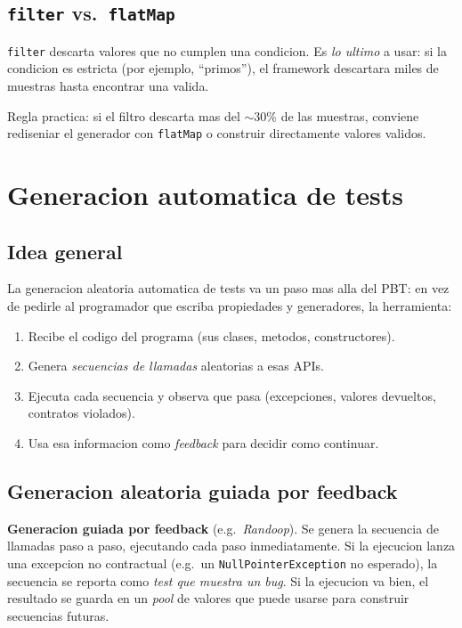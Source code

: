 \documentclass[12pt,a4paper]{article}
\begin{document}
\subsection{\texttt{filter} vs.\ \texttt{flatMap}}

\texttt{filter} descarta valores que no cumplen una condicion. Es \emph{lo ultimo} a usar:
si la condicion es estricta (por ejemplo, ``primos''), el framework descartara miles de
muestras hasta encontrar una valida.

\begin{ideabox}
Regla practica: si el filtro descarta mas del $\sim$30\% de las muestras, conviene rediseniar
el generador con \texttt{flatMap} o construir directamente valores validos.
\end{ideabox}

\section{Generacion automatica de tests}

\subsection{Idea general}

La generacion aleatoria automatica de tests va un paso mas alla del PBT: en vez de pedirle al
programador que escriba propiedades y generadores, la herramienta:

\begin{enumerate}
  \item Recibe el codigo del programa (sus clases, metodos, constructores).
  \item Genera \emph{secuencias de llamadas} aleatorias a esas APIs.
  \item Ejecuta cada secuencia y observa que pasa (excepciones, valores devueltos, contratos
  violados).
  \item Usa esa informacion como \emph{feedback} para decidir como continuar.
\end{enumerate}

\subsection{Generacion aleatoria guiada por feedback}

\begin{definicionbox}
\textbf{Generacion guiada por feedback} (e.g.\ \emph{Randoop}). Se genera la secuencia de
llamadas paso a paso, ejecutando cada paso inmediatamente. Si la ejecucion lanza una
excepcion no contractual (e.g.\ un \texttt{NullPointerException} no esperado), la secuencia
se reporta como \emph{test que muestra un bug}. Si la ejecucion va bien, el resultado se
guarda en un \emph{pool} de valores que puede usarse para construir secuencias futuras.
\end{definicionbox}
\end{document}
